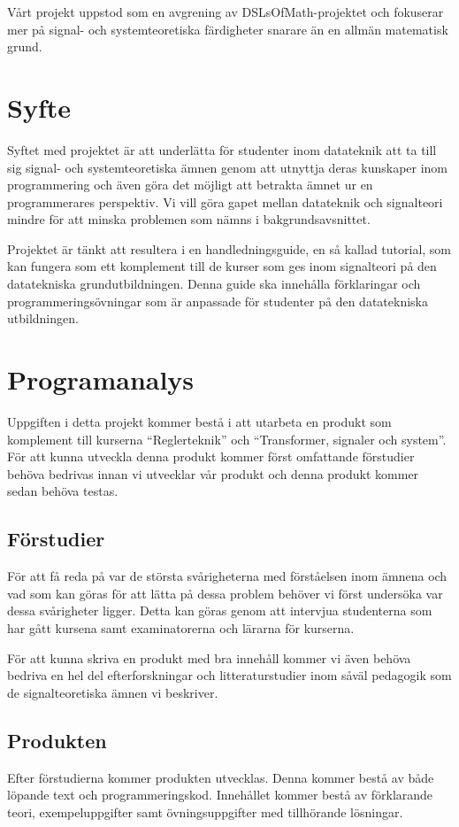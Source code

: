 \documentclass{article}
\begin{document}
Vårt projekt uppstod som en avgrening av DSLsOfMath-projektet och fokuserar mer på signal- och systemteoretiska färdigheter snarare än en allmän matematisk grund.

\section{Syfte}
Syftet med projektet är att underlätta för studenter inom datateknik att ta till sig signal- och systemteoretiska ämnen genom att utnyttja deras kunskaper inom programmering och även göra det möjligt att betrakta ämnet ur en programmerares perspektiv. Vi vill göra gapet mellan datateknik och signalteori mindre för att minska problemen som nämns i bakgrundsavsnittet.

Projektet är tänkt att resultera i en handledningsguide, en så kallad tutorial, som kan fungera som ett komplement till de kurser som ges inom signalteori på den datatekniska grundutbildningen. Denna guide ska innehålla förklaringar och programmeringsövningar som är anpassade för studenter på den datatekniska utbildningen.

\section{Programanalys}
Uppgiften i detta projekt kommer bestå i att utarbeta en produkt som komplement till kurserna “Reglerteknik” och “Transformer, signaler och system”. För att kunna utveckla denna produkt kommer först omfattande förstudier behöva bedrivas innan vi utvecklar vår produkt och denna produkt kommer sedan behöva testas.
\subsection{Förstudier}
För att få reda på var de största svårigheterna med förståelsen inom ämnena och vad som kan göras för att lätta på dessa problem behöver vi först undersöka var dessa svårigheter ligger. Detta kan göras genom att intervjua studenterna som har gått kursena samt examinatorerna och lärarna för kurserna.

För att kunna skriva en produkt med bra innehåll kommer vi även behöva bedriva en hel del efterforskningar och litteraturstudier inom såväl pedagogik som de signalteoretiska ämnen vi beskriver.
\subsection{Produkten}
Efter förstudierna kommer produkten utvecklas. Denna kommer bestå av både löpande text och programmeringskod. Innehållet kommer bestå av förklarande teori, exempeluppgifter samt övningsuppgifter med tillhörande lösningar.
\end{document}
